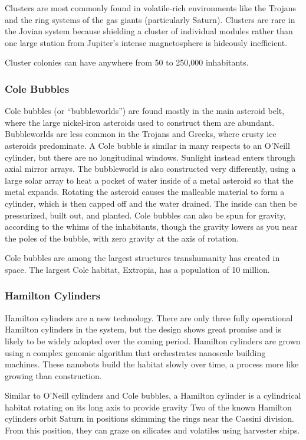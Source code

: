 Clusters are most commonly found in volatile-rich environments 
like the Trojans and the ring systems of the gas giants (particularly 
Saturn). Clusters are rare in the Jovian system because shielding a 
cluster of individual modules rather than one large station from 
Jupiter's intense magnetosphere is hideously inefficient.

Cluster colonies can have anywhere from 50 to 250,000 inhabitants.

\subsubsection{Cole Bubbles}

Cole bubbles (or ``bubbleworlds'') are found mostly in the main 
asteroid belt, where the large nickel-iron asteroids used to construct 
them are abundant. Bubbleworlds are less common in the Trojans 
and Greeks, where crusty ice asteroids predominate. A Cole bubble 
is similar in many respects to an O'Neill cylinder, but there are no 
longitudinal windows. Sunlight instead enters through axial mirror 
arrays. The bubbleworld is also constructed very differently, using a 
large solar array to heat a pocket of water inside of a metal asteroid 
so that the metal expands. Rotating the asteroid causes the malleable
material to form a cylinder, which is then capped off and the
water drained. The inside can then be pressurized, built out, and 
planted. Cole bubbles can also be spun for gravity, according to the 
whims of the inhabitants, though the gravity lowers as you near the 
poles of the bubble, with zero gravity at the axis of rotation.

Cole bubbles are among the largest structures transhumanity has 
created in space. The largest Cole habitat, Extropia, has a population
of 10 million.

\subsubsection{Hamilton Cylinders}

Hamilton cylinders are a new technology. There are only three fully 
operational Hamilton cylinders in the system, but the design shows 
great promise and is likely to be widely adopted over the coming 
period. Hamilton cylinders are grown using a complex genomic 
algorithm that orchestrates nanoscale building machines. These 
nanobots build the habitat slowly over time, a process more like 
growing than construction.

Similar to O'Neill cylinders and Cole bubbles, a Hamilton cylinder
is a cylindrical habitat rotating on its long axis to provide gravity
Two of the known Hamilton cylinders orbit Saturn in positions
skimming the rings near the Cassini division. From this position, 
they can graze on silicates and volatiles using harvester ships.

